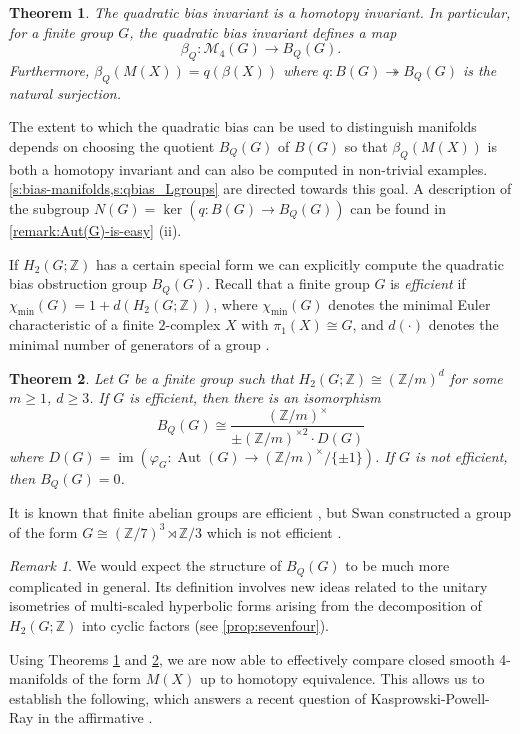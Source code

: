\documentclass[11pt,a4paper,leqno]{amsart}
\newtheorem{thmx}{Theorem}
\theoremstyle{definition}
\theoremstyle{remark}
\newtheorem{remark}[theorem]{Remark}
\newcommand{\cy}[1]{\Z/{#1}}
\newcommand{\Z}{\mathbb{Z}}
\DeclareMathOperator{\Aut}{Aut}
\DeclareMathOperator{\IM}{im}
\newcommand{\sM}{\mathscr{M}}
\newcommand{\bZ}{\mathbb Z}
\begin{document}
\begin{thmx} \label{thmx:main-general}
The quadratic bias invariant is a homotopy invariant. In particular, for a finite group $G$, the quadratic bias invariant defines a map
\[ \beta_Q\colon  
\sM_4(G) \to B_Q(G). \]
Furthermore, $\beta_Q(M(X)) = q(\beta(X))$ where $q \colon B(G) \twoheadrightarrow B_Q(G)$ is the natural surjection.	
\end{thmx}

The extent to which the quadratic bias can be used to distinguish manifolds depends on choosing the quotient $B_Q(G)$ of $B(G)$ so that $\beta_Q(M(X))$ is both a homotopy invariant and can also be computed in non-trivial examples.
\cref{s:bias-manifolds,s:qbias_Lgroups} are directed towards this goal.
A description of the subgroup $N(G)= \ker(q\colon B(G) \to B_Q(G))$ can be found in \cref{remark:Aut(G)-is-easy} (ii).

If $H_2(G;\bZ)$ has a certain special form  we can explicitly compute the quadratic bias obstruction group $B_Q(G)$.
Recall that a finite group $G$ is \textit{efficient} if $\chi_{\min}(G) = 1 + d(H_2(G;\Z))$, where $\chi_{\min}(G)$ denotes the minimal Euler characteristic of a finite $2$-complex $X$ with $\pi_1(X) \cong G$, and 
$d(\cdot)$ denotes the minimal number of generators of a group \cite{Ha00}.

\begin{thmx} \label{thmx:main-B_Q(G)}
Let $G$ be a finite group such that $H_2(G;\Z) \cong (\Z/m)^d$ 
for some $m\geq 1$, $d \ge 3$.  If $G$ is efficient, then there is an isomorphism
\[ B_Q(G) \cong \frac{(\Z/m)^\times}{\pm (\cy m)^{\times 2} \cdot D(G)}\]
where $D(G) = \IM(\varphi_G\colon  \Aut(G) \to  (\Z/m)^\times/\{\pm 1\})$. If $G$ is not efficient, then $B_Q(G)=0$.
\end{thmx}

It is known that finite abelian groups are efficient \cite[Proposition 5]{Sieradski:1979}, but Swan constructed a group of the form $G \cong (\cy 7)^3 \rtimes \cy 3$ which is not efficient \cite[p196]{Swan:1965}.

\begin{remark} We would expect the structure of $B_Q(G)$ to be much more complicated in general. Its definition involves new ideas related to the unitary isometries of multi-scaled hyperbolic forms arising from the decomposition of $H_2(G;\bZ)$ into cyclic factors (see \cref{prop:sevenfour}).
\end{remark}

Using Theorems \ref{thmx:main-general} and \ref{thmx:main-B_Q(G)}, we are now able to effectively compare closed smooth 4-manifolds of the form $M(X)$ up to homotopy equivalence. This allows us to establish the following, which answers a recent question of Kasprowski-Powell-Ray in the affirmative \cite[Question 1.5]{KPR22}.
\end{document}

